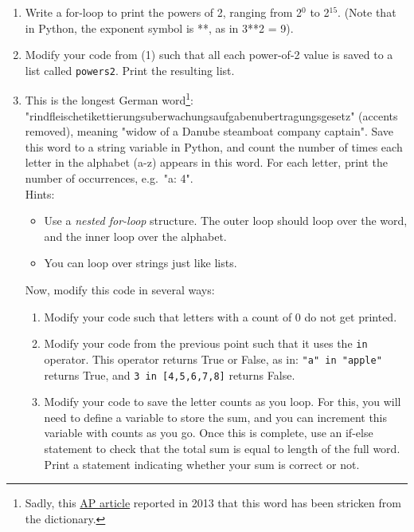 \documentclass{article}[12pt]
\newcommand{\code}[1]{\texttt{#1}}  %
\begin{document}
\begin{enumerate}[itemsep=5ex]
	\item Write a for-loop to print the powers of 2, ranging from 2$^0$ to 2$^{15}$. (Note that in Python, the exponent symbol is **, as in 3**2 = 9). 
	
	\item Modify your code from (1) such that all each power-of-2 value is saved to a list called \code{powers2}. Print the resulting list. 

	
	\item This is the longest German word\footnote{Sadly, this \href{http://www.salon.com/2013/06/03/law_change_spells_end_for_germanys_longest_word_ap/}{AP article} reported in 2013 that this word has been stricken from the dictionary.}: "rindfleischetikettierungsuberwachungsaufgabenubertragungsgesetz" (accents removed), meaning "widow of a Danube steamboat company captain". Save this word to a string variable in Python, and count the number of times each letter in the alphabet (a-z) appears in this word. For each letter, print the number of occurrences, e.g.\ "a: 4". 
	\\ Hints:
	\begin{itemize}
		\item Use a \emph{nested for-loop} structure. The outer loop should loop over the word, and the inner loop over the alphabet.		\item You can loop over strings just like lists.
	\end{itemize} 
	Now, modify this code in several ways:
	\begin{enumerate}[itemsep=2ex]
		\item Modify your code such that letters with a count of 0 do not get printed. 
		\item Modify your code from the previous point such that it uses the \code{in} operator. This operator returns True or False, as in: \code{"a" in "apple"} returns True, and \code{3 in [4,5,6,7,8]} returns False.
		\item Modify your code to save the letter counts as you loop. For this, you will need to define a variable to store the sum, and you can increment this variable with counts as you go. Once this is complete, use an if-else statement to check that the total sum is equal to length of the full word. Print a statement indicating whether your sum is correct or not.
	\end{enumerate}
	

\end{enumerate}
\end{document}
